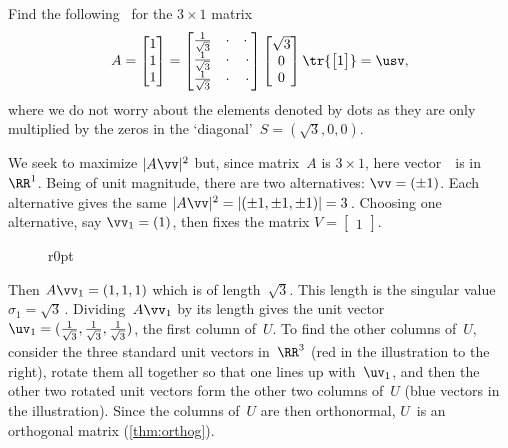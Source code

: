 \begin{example} \label{eg:3x1svd}
\def\thr{\frac1{\sqrt 3}}
Find the following \svd\ for the \(3\times1\) matrix
\begin{equation*}
A=\begin{bmatrix} 1\\1\\1 \end{bmatrix}
=\begin{bmatrix} \thr&\cdot&\cdot\;
\\\thr&\cdot&\cdot
\\\thr&\cdot&\cdot \end{bmatrix}
\begin{bmatrix} \sqrt3\\0\\0 \end{bmatrix}
\tr{\begin{bmatrix} 1 \end{bmatrix}}=\usv,
\end{equation*}
where we do not worry about the elements denoted by dots as they are only multiplied by the zeros in the `diagonal'~\(S=(\sqrt3,0,0)\).
\begin{solution} 
We seek to maximize \(|A\vv|^2\) but, since matrix~\(A\) is \(3\times1\), here vector~\vv\ is in~\(\RR^1\).  
Being of unit magnitude, there are two alternatives: \(\vv=(\pm 1)\). 
Each alternative gives the same \(|A\vv|^2=|(\pm1,\pm1,\pm1)|=3\)\,.  
Choosing one alternative, say \(\vv_1=(1)\), then fixes the matrix \(V=\begin{bmatrix} 1 \end{bmatrix}\).

\begin{wrapfigure}r{0pt}
\end{wrapfigure}
Then \(A\vv_1=(1,1,1)\) which is of length~\(\sqrt3\).
This length is the singular value \(\sigma_1=\sqrt3\)\,.  
Dividing~\(A\vv_1\) by its length gives the unit vector \(\uv_1=(\thr,\thr,\thr)\), the first column of~\(U\).  
To find the other columns of~\(U\), consider the three standard unit vectors in~\(\RR^3\) (red in the illustration to the right), rotate them all together so that one lines up with~\(\uv_1\), and then the other two rotated unit vectors form the other two columns of~\(U\) (blue vectors in the illustration).  
Since the columns of~\(U\) are then orthonormal, \(U\)~is an orthogonal matrix (\cref{thm:orthog}).
\aqed


\end{solution}
\end{example}
